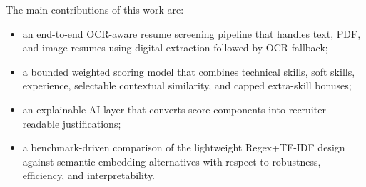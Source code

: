 The main contributions of this work are:
\begin{itemize}
    \item an end-to-end OCR-aware resume screening pipeline that handles text, PDF, and image resumes using digital extraction followed by OCR fallback;
    \item a bounded weighted scoring model that combines technical skills, soft skills, experience, selectable contextual similarity, and capped extra-skill bonuses;
    \item an explainable AI layer that converts score components into recruiter-readable justifications;
    \item a benchmark-driven comparison of the lightweight Regex+TF-IDF design against semantic embedding alternatives with respect to robustness, efficiency, and interpretability.
\end{itemize}
